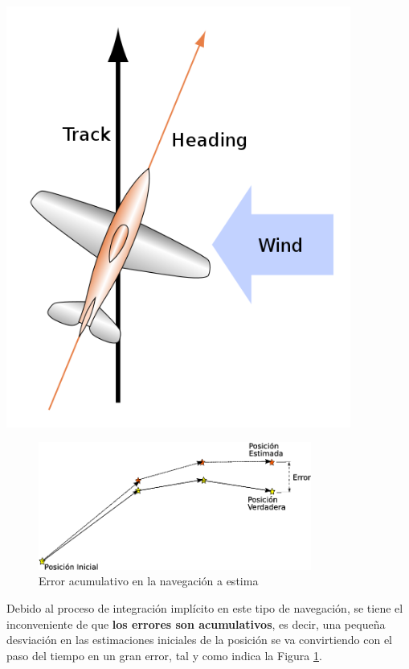 \begin{minipage}[b]{0.30\linewidth} \centering
  \includegraphics[width=0.85\textwidth]{Imagenes/06.00.navegacion/ajuste-viento.png}
\end{minipage}

\begin{figure}[!h]
  \centering
  \includegraphics[keepaspectratio,width=0.8\textwidth]{./Imagenes/06.00.navegacion/dead-reckoning-error.png}  
  \caption{Error acumulativo en la navegaci\'on a estima \cite{Salazar_nav_aerea}}
  \label{fig:dead-reckoning-error}
\end{figure}

      
Debido al proceso de integraci\'on impl\'icito en este tipo de navegaci\'on, se tiene el inconveniente de que \textbf{los errores son acumulativos}, es decir, una peque\~na desviaci\'on en las estimaciones iniciales de la posici\'on se va convirtiendo con el paso del tiempo en un gran error, tal y como indica la Figura \ref{fig:dead-reckoning-error}.



